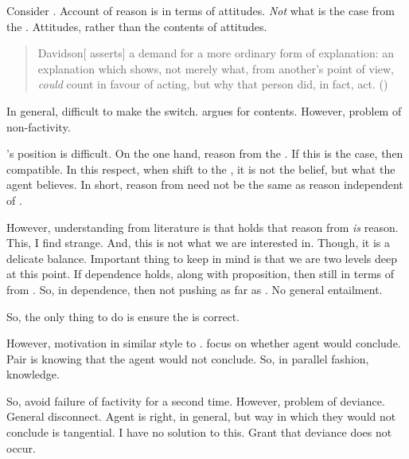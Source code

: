 \begin{note}
  Consider \citeauthor{Davidson:1963aa}.
  Account of reason is in terms of attitudes.
  \emph{Not} what is the case from the \agpe{}.
  Attitudes, rather than the contents of attitudes.

  \begin{quote}
    Davidson[ asserts] a demand for a more ordinary form of explanation:
    an explanation which shows, not merely what, from another's point of view, \emph{could} count in favour of acting, but why that person did, in fact, act.%
    \mbox{}\hfill\mbox{(\cite[417]{Hieronymi:2011aa})}
  \end{quote}

  In general, difficult to make the switch.
  \textcite{Dancy:2000aa} argues for contents.
  However, problem of non-factivity.

  \citeauthor{Dancy:2000aa}'s position is difficult.
  On the one hand, reason from the \agpe{}.
  If this is the case, then compatible.
  In this respect, when shift to the \agpe{}, it is not the \agents{} belief, but what the agent believes.
  In short, reason from \agpe{} need not be the same as reason independent of \agpe{}.

  However, understanding from literature is that \citeauthor{Dancy:2000aa} holds that reason from \agpe{} \emph{is} reason.
  This, I find strange.
  And, this is not what we are interested in.
  Though, it is a delicate balance.
  Important thing to keep in mind is that we are two levels deep at this point.
  If dependence holds, along with proposition, then still in terms of \ros{} from \agpe{}.
  So, in dependence, then not pushing as far as \citeauthor{Dancy:2000aa}.
  No general entailment.
\end{note}

\begin{note}
  So, the only thing to do is ensure the \agpe{} is correct.

  However, motivation in similar style to .
   focus on whether agent would conclude.
  Pair is knowing that the agent would not conclude.
  So, in parallel fashion, knowledge.
\end{note}

\begin{note}
  So, avoid failure of factivity for a second time.
  However, problem of deviance.
  General disconnect.
  Agent is right, in general, but way in which they would not conclude is tangential.
  I have no solution to this.
  Grant that deviance does not occur.
\end{note}


